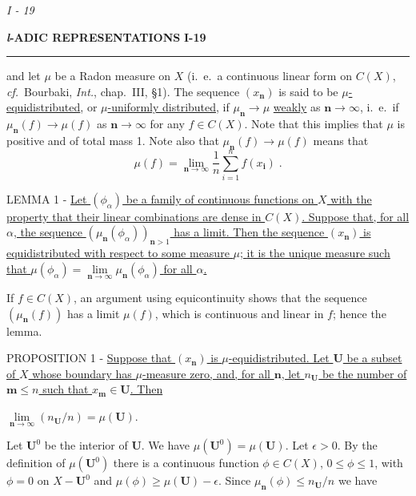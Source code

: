 \clearpage
\begin{center}
{\itshape \large I - 19}
\end{center}
\vspace{1em}

\noindent\textbf{\textit{l}-ADIC REPRESENTATIONS} \hfill \textbf{I-19}

\noindent\rule{\textwidth}{0.4pt}

\noindent
and let $\mu$ be a Radon measure on $X$ (i.~e.~a continuous linear form on $C(X)$, \textit{cf.}~Bourbaki, \textit{Int.}, chap.~III, \S1). The sequence $(x_{\mathbf n})$ is said to be \underline{$\mu$-equidistributed}, or \underline{$\mu$-uniformly distributed}, if $\mu_{\mathbf n} \longrightarrow \mu$ \underline{weakly} as ${\mathbf n} \longrightarrow \infty$, i.~e.~if $\mu_{\mathbf n}(f) \longrightarrow \mu(f)$ as ${\mathbf n} \longrightarrow \infty$ for any $f \in C(X)$. Note that this implies that $\mu$ is positive and of total mass 1. Note also that $\mu_{\mathbf n}(f) \longrightarrow \mu(f)$ means that
\[
\mu(f) = \lim_{{\mathbf n} \to \infty} \frac{1}{n} \sum_{i=1}^{n} f(x_{\mathbf i}) \; .
\]

\noindent
LEMMA 1 - \underline{Let $(\phi_{\alpha})$ be a family of continuous functions on $X$ with the property that their linear combinations are dense in $C(X)$. Suppose that, for all $\alpha$, the sequence $(\mu_{\mathbf n}(\phi_{\alpha}))_{{\mathbf n}>1}$ has a limit. Then the sequence $(x_{\mathbf n})$ is equidistributed with respect to some measure $\mu$; \underline{it is the unique measure such that} $\mu(\phi_{\alpha}) = \lim\limits_{{\mathbf n} \to \infty} \mu_{\mathbf n}(\phi_{\alpha})$ \underline{for all} $\alpha$.}

If $f \in C(X)$, an argument using equicontinuity shows that the sequence $(\mu_{\mathbf n}(f))$ has a limit $\mu(f)$, which is continuous and linear in $f$; hence the lemma.

\noindent
PROPOSITION 1 - \underline{Suppose that $(x_{\mathbf n})$ is $\mu$-equidistributed. Let $\mathbf U$ be a subset of $X$ whose boundary has $\mu$-measure zero, and, for all $\mathbf n$, let $n_{\mathbf U}$ be the number of $\mathbf m \leq n$ such that $x_{\mathbf m} \in \mathbf U$. Then}

\hspace*{1.5em}$\lim\limits_{{\mathbf n} \to \infty} (n_{\mathbf U}/n) = \mu(\mathbf U)$.

Let $\mathbf U^0$ be the interior of $\mathbf U$. We have $\mu(\mathbf U^0) = \mu(\mathbf U)$. Let $\epsilon > 0$. By the definition of $\mu(\mathbf U^0)$ there is a continuous function $\phi \in C(X)$, $0 \leq \phi \leq 1$, with $\phi = 0$ on $X - \mathbf U^0$ and $\mu(\phi) \geq \mu(\mathbf U) - \epsilon$. Since $\mu_{\mathbf n}(\phi) \leq n_{\mathbf U}/n$ we have

